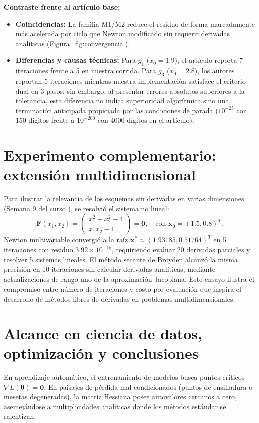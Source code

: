 \documentclass[10pt,a4paper]{article}
\begin{document}
\textbf{Contraste frente al artículo base:}
\begin{itemize}
\item \textbf{Coincidencias:} La familia M1/M2 reduce el residuo de forma marcadamente más acelerada por ciclo que Newton modificado sin requerir derivadas analíticas (Figura~\ref{fig:convergencia}).
\item \textbf{Diferencias y causas técnicas:} Para $g_1$ ($x_0=1.9$), el artículo reporta 7 iteraciones frente a 5 en nuestra corrida. Para $g_3$ ($x_0=2.8$), los autores reportan 5 iteraciones mientras nuestra implementación satisface el criterio dual en 3 pasos; sin embargo, al presentar errores absolutos superiores a la tolerancia, esta diferencia no indica superioridad algorítmica sino una terminación anticipada propiciada por las condiciones de parada ($10^{-25}$ con 150 dígitos frente a $10^{-200}$ con 4000 dígitos en el artículo).
\end{itemize}

\section{Experimento complementario: extensión multidimensional}
Para ilustrar la relevancia de los esquemas sin derivadas en varias dimensiones (Semana 9 del curso \cite{turner}), se resolvió el sistema no lineal:
\[ \mathbf{F}(x_1, x_2) = \begin{pmatrix} x_1^2 + x_2^2 - 4 \\ x_1 x_2 - 1 \end{pmatrix} = \mathbf{0}, \quad \text{con } \mathbf{x}_0 = (1.5, 0.8)^T. \]
Newton multivariable convergió a la raíz $\mathbf{x}^*\approx (1.93185, 0.51764)^T$ en 5 iteraciones con residuo $3.92\times 10^{-15}$, requiriendo evaluar 20 derivadas parciales y resolver 5 sistemas lineales. El método secante de Broyden alcanzó la misma precisión en 10 iteraciones sin calcular derivadas analíticas, mediante actualizaciones de rango uno de la aproximación Jacobiana. Este ensayo ilustra el compromiso entre número de iteraciones y costo por evaluación que inspira el desarrollo de métodos libres de derivadas en problemas multidimensionales.

\section{Alcance en ciencia de datos, optimización y conclusiones}
En aprendizaje automático, el entrenamiento de modelos busca puntos críticos $\nabla L(\boldsymbol{\theta})=\mathbf{0}$. En paisajes de pérdida mal condicionados (puntos de ensilladura o mesetas degeneradas), la matriz Hessiana posee autovalores cercanos a cero, asemejándose a multiplicidades analíticas donde los métodos estándar se ralentizan.
\end{document}
